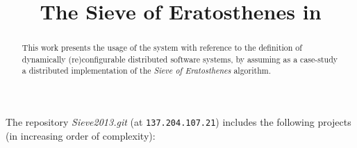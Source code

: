 \documentclass{../llncs}
\begin{document}
\title{The Sieve of Eratosthenes in \contact{}}
\author{\xauthAN }
\maketitle

\begin{abstract}
\footnotesize
This work presents the usage of the \contact{} system with reference to the definition of  dynamically (re)configurable distributed software systems, by assuming as a case-study a distributed implementation of the \emph{Sieve of Eratosthenes} algorithm.
 \end{abstract}


The repository \textit{Sieve2013.git} (at \texttt{137.204.107.21}) includes the following projects (in increasing order of complexity):
\end{document}
